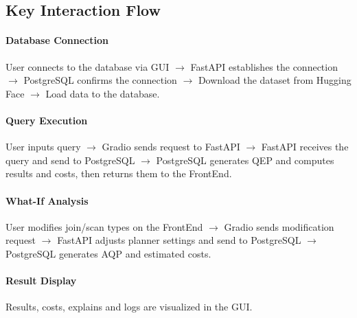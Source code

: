

\subsection{Key Interaction Flow}

\paragraph{Database Connection} User connects to the database via GUI $\to$ FastAPI establishes the connection $\to$ PostgreSQL confirms the connection $\to$ Download the dataset from Hugging Face $\to$ Load data to the database.

\paragraph{Query Execution} User inputs query $\to$ Gradio sends request to FastAPI $\to$ FastAPI receives the query and send to PostgreSQL $\to$ PostgreSQL generates QEP and computes results and costs, then returns them to the FrontEnd.

\paragraph{What-If Analysis} User modifies join/scan types on the FrontEnd $\to$ Gradio sends modification request $\to$ FastAPI adjusts planner settings and send to PostgreSQL $\to$ PostgreSQL generates AQP and estimated costs.

\paragraph{Result Display} Results, costs, explains and logs are visualized in the GUI.
